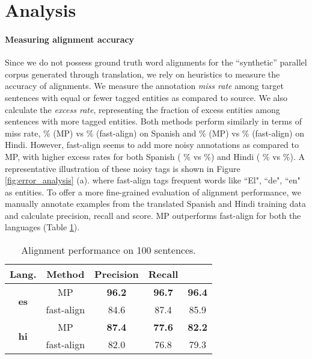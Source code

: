 \documentclass[11pt,a4paper]{article}
\begin{document}
\section{Analysis}


\paragraph{Measuring alignment accuracy}
Since we do not possess ground truth word alignments 
for the ``synthetic'' parallel corpus generated through translation, 
we rely on heuristics to measure the accuracy of alignments. 
We measure the annotation \emph{miss rate} among target sentences
with equal or fewer tagged entities as compared to source.
We also calculate the \emph{excess rate}, 
representing the fraction of excess entities 
among sentences with more tagged entities. 
Both methods perform similarly in terms of 
miss rate,  \% (MP) vs  \% (fast-align) 
on Spanish and  \% (MP) vs  \% (fast-align) on Hindi. 
However, fast-align seems 
to add 
more noisy annotations as compared to MP, 
with higher excess rates for both Spanish ( \% vs  \%) 
and Hindi ( \% vs  \%). 
A representative illustration of these noisy tags 
is shown in Figure \ref{fig:error_analysis} (a).
where fast-align tags frequent words like ``El", ``de", ``en" as entities.
To offer a more fine-grained evaluation of alignment performance, 
we manually annotate  examples from 
the translated Spanish and Hindi training data 
and calculate precision, recall and  score. 
MP outperforms fast-align for both the languages (Table \ref{tab:align-perf}).

\begin{table}[htb]
\small
\centering
\begin{tabularx}{220pt}{ccccc}
\toprule
\bf Lang. & \bf Method & \bf Precision & \bf Recall & \bf  \\
\midrule
\multirow{2}{*}{\bf es} & MP & \bf 96.2 & \bf 96.7 & \bf 96.4 \\
 & fast-align & 84.6 & 87.4 & 85.9 \\
\midrule
\multirow{2}{*}{\bf hi} & MP & \bf 87.4 & \bf 77.6 & \bf 82.2 \\
& fast-align & 82.0 & 76.8 & 79.3 \\
\bottomrule
\end{tabularx}
\caption{Alignment performance on 100 sentences.}
\label{tab:align-perf}
\end{table}
\end{document}
